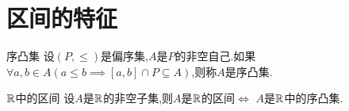 \section{区间的特征}

\begin{definition}{序凸集}{}
	设$\left(P,\leq\right)$是偏序集,$A$是$P$的非空自己.如果$\forall a,b\in A\left(a\leq b\implies\left[a,b\right]\cap P\subseteq A\right)$,则称$A$是序凸集.
\end{definition}

\begin{proposition}{$\mathbb{R}$中的区间}{}
	设$A$是$\mathbb{R}$的非空子集,则$A$是$\mathbb{R}$的区间$\iff$ $A$是$\mathbb{R}$中的序凸集.
\end{proposition}
